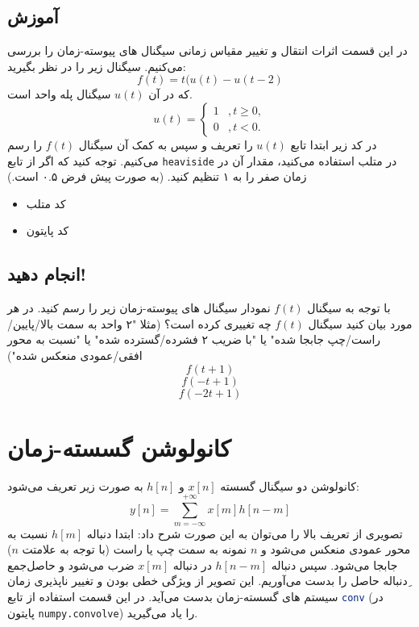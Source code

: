 \documentclass{utsignal}
\begin{document}
	\subsection{آموزش}
	در این قسمت اثرات انتقال و تغییر مقیاس زمانی سیگنال های پیوسته-زمان را بررسی می‌کنیم. سیگنال زیر را در نظر بگیرید: 
	$$f(t)=t(u(t)-u(t-2)$$
	که در آن $u(t)$ سیگنال پله واحد است.
	$$
	u(t) = \begin{cases}
	1&, t \ge 0,\\
	0&, t < 0.
	\end{cases}$$
	در کد زیر ابتدا تابع $u(t)$ را تعریف و سپس به کمک آن سیگنال $f(t)$ را رسم می‌کنیم.
	توجه کنید که اگر از تابع \lstinline[language=Octave]{heaviside} در متلب استفاده می‌کنید، مقدار آن در زمان صفر را به ۱ تنظیم کنید. (به صورت پیش فرض ۰.۵ است.)
	\begin{itemize}
		\item کد متلب
	\end{itemize}
	\begin{latin}
		
	\end{latin}
	\begin{itemize}
		\item کد پایتون
	\end{itemize}
	\begin{latin}
		
	\end{latin}
	\subsection{انجام دهید!}
	 با توجه به سیگنال $f(t)$ نمودار سیگنال های پیوسته-زمان زیر را رسم کنید. در هر مورد بیان کنید سیگنال $f(t)$ چه تغییری کرده است؟ (مثلا "۲ واحد به سمت بالا/پایین/راست/چپ جابجا شده" یا "با ضریب ۲ فشرده/گسترده شده" یا "نسبت به محور افقی/عمودی منعکس شده")
	 $$f(t+1)$$
	 $$f(-t+1)$$
	 $$f(-2t+1)$$
	\section{کانولوشن گسسته-زمان}
	کانولوشن دو سیگنال گسسته $x[n]$ و $h[n]$ به صورت زیر تعریف می‌شود:
	$$y[n]=\sum_{m=-\infty}^{+\infty} x[m]h[n-m]$$
	تصویری از تعریف بالا را می‌توان به این صورت شرح داد: ابتدا دنباله  $h[m]$ نسبت به محور عمودی منعکس می‌شود و  $n$ نمونه به سمت چپ یا راست (با توجه به علامتت $n$) جابجا می‌شود. سپس دنباله  $h[n-m]$ در دنباله  $x[m]$ ضرب می‌شود و حاصل‌جمع ِدنباله حاصل را بدست می‌آوریم. این تصویر از ویژگی خطی بودن و تغییر ناپذیری زمان سیستم های گسسته-زمان بدست می‌آید. در این قسمت استفاده از تابع \lstinline[language=Octave]{conv} (در پایتون \lstinline[language=Python]{numpy.convolve}) را یاد می‌گیرید.
\end{document}
